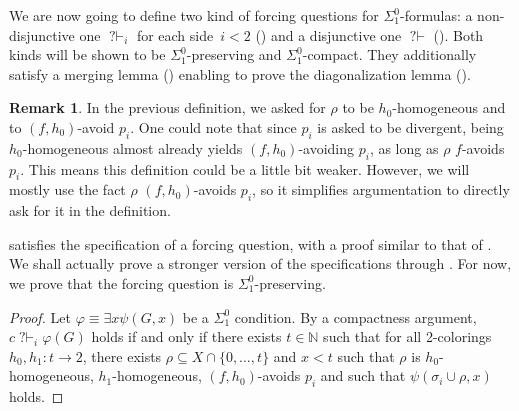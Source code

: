 \documentclass{article}
\newcommand{\qvdash}{\operatorname{{?}{\vdash}}}
\newcommand{\NN}[0]{\mathbb{N}}
\def\qt#1{``#1''}%
\def\N{\mathbb{N}}
\def\NN{\mathbb{N}}
\def\qt#1{``#1''}%
\numberwithin{theorem}{section}
\newtheorem{lemma}[theorem]{Lemma}
\theoremstyle{definition}
\newtheorem{definition}[theorem]{Definition}
\newtheorem{remark}[theorem]{Remark}
\begin{document}
We are now going to define two kind of forcing questions for $\Sigma^0_1$-formulas: a non-disjunctive one $\qvdash_i$ for each side~$i < 2$ () and a disjunctive one $\qvdash$ (). Both kinds will be shown to be $\Sigma^0_1$-preserving and $\Sigma^0_1$-compact. They additionally satisfy a merging lemma () enabling to prove the diagonalization lemma ().


\begin{remark}
    In the previous definition, we asked for $\rho$ to be $h_0$-homogeneous and to $(f,h_0)$-avoid $p_i$. One could note that since $p_i$ is asked to be divergent, being $h_0$-homogeneous almost already yields $(f,h_0)$-avoiding $p_i$, as long as $\rho$ $f$-avoids $p_i$. This means this definition could be a little bit weaker. However, we will mostly use the fact $\rho$ $(f,h_0)$-avoids $p_i$, so it simplifies argumentation to directly ask for it in the definition.
\end{remark}

 satisfies the specification of a forcing question, with a proof similar to that of .
We shall actually prove a stronger version of the specifications through .
For now, we prove that the forcing question is $\Sigma^0_1$-preserving.


\begin{proof}
   Let $\varphi \equiv \exists x \psi(G, x)$ be a $\Sigma_1^0$ condition. By a compactness argument, $c \qvdash_i \varphi(G)$ holds if and only if there exists $t \in \NN$ such that for all 2-colorings $h_0, h_1 : t \to 2$, there exists $\rho \subseteq X \cap \{0, \dots, t \}$ and $x < t$ such that $\rho$ is $h_0$-homogeneous, $h_1$-homogeneous, $(f,h_0)$-avoids $p_i$ and such that $\psi(\sigma_i \cup \rho, x)$ holds.
\end{proof}
\end{document}
